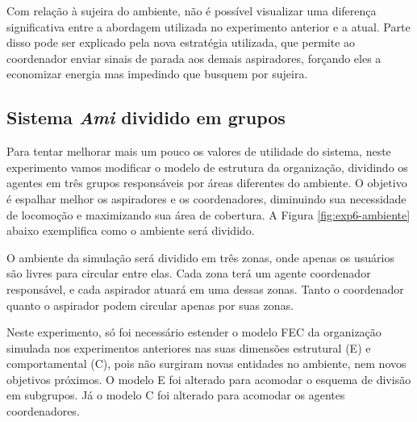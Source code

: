 Com relação à sujeira do ambiente, não é possível visualizar uma diferença significativa entre a abordagem utilizada no experimento anterior e a atual. Parte disso pode ser explicado pela nova estratégia utilizada, que permite ao coordenador enviar sinais de parada aos demais aspiradores, forçando eles a economizar energia mas impedindo que busquem por sujeira.


\subsection{Sistema \textit{Ami} dividido em grupos}
\label{sec:grupo}

Para tentar melhorar mais um pouco os valores de utilidade do sistema, neste experimento vamos modificar o modelo de estrutura da organização, dividindo os agentes em três grupos responsáveis por áreas diferentes do ambiente. O objetivo é espalhar melhor os aspiradores e os coordenadores, diminuindo sua necessidade de locomoção e maximizando sua área de cobertura. A Figura \ref{fig:exp6-ambiente} abaixo exemplifica como o ambiente será dividido. 

\begin{figure}[h!]
    \centering
\end{figure}

O ambiente da simulação será dividido em três zonas, onde apenas os usuários são livres para circular entre elas. Cada zona terá um agente coordenador responsável, e cada aspirador atuará em uma dessas zonas. Tanto o coordenador quanto o aspirador podem circular apenas por suas zonas. 

Neste experimento, só foi necessário estender o modelo FEC da organização simulada nos experimentos anteriores nas suas dimensões estrutural (E) e comportamental (C), pois não surgiram novas entidades no ambiente, nem novos objetivos próximos. O modelo E foi alterado para acomodar o esquema de divisão em subgrupos. Já o modelo C foi alterado para acomodar os agentes coordenadores.

